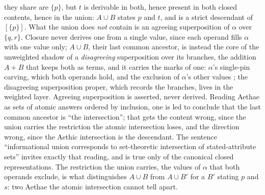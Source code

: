 they share are $\{p\}$, but $t$ is derivable in both, hence present in both closed contents, hence in the union: $A \cup B$ states $p$ and $t$, and is a strict descendant of $[\{p\}]$. What the union does \emph{not} contain is an agreeing superposition of $\alpha$ over $\{q, r\}$. Closure never derives one from a single value, since each operand fills $\alpha$ with one value only; $A \cup B$, their last common ancestor, is instead the core of the unweighted shadow of a \emph{disagreeing} superposition over its branches, the addition $A + B$ that keeps both as terms, and it carries the marks of one: $\alpha$'s single-pin carving, which both operands hold, and the exclusion of $\alpha$'s other values \cite{Aethus}; the disagreeing superposition proper, which records the branches, lives in the weighted layer. Agreeing superposition is asserted, never derived. Reading Aethae as sets of atomic answers ordered by inclusion, one is led to conclude that the last common ancestor is ``the intersection''; that gets the content wrong, since the union carries the restriction the atomic intersection loses, and the direction wrong, since the Aethic intersection is the descendant. The sentence ``informational union corresponds to set-theoretic intersection of stated-attribute sets'' invites exactly that reading, and is true only of the canonical closed representations. The restriction the union carries, the values of $\alpha$ that both operands exclude, is what distinguishes $A \cup B$ from $A \cup B'$ for a $B'$ stating $p$ and $s$: two Aethae the atomic intersection cannot tell apart.
